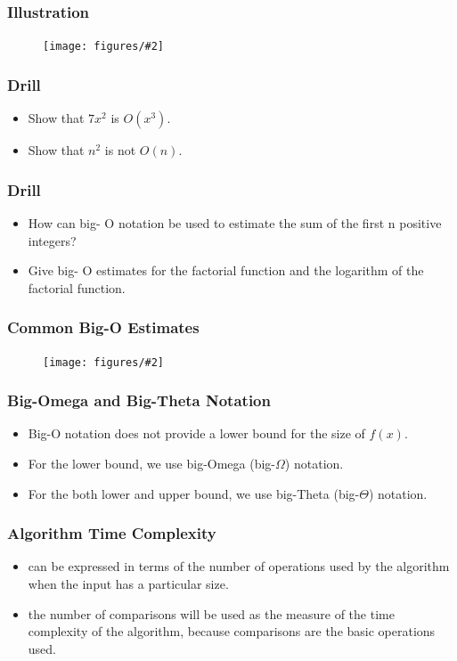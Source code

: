 \documentclass{beamer}
\newcommand{\fig}[2]{
\begin{center}
\begin{figure}
\texttt{[image: figures/\#2]}
\end{figure}
\end{center}
}
\begin{document}
 \begin{frame}
\frametitle{Illustration}
\fig{0.5}{bigo}
\end{frame}

\begin{frame}
\frametitle{\huge Drill}
\Large
\begin{itemize} 
\item <1->  Show that $7x^2$ is $O(x^3)$.
\item <2->  Show that $n^2$ is not $O (n)$.
\end{itemize}
 \end{frame}



\begin{frame}
\frametitle{\huge Drill}
\Large
\begin{itemize} 
\item <1->  How can big- O notation be used to estimate the sum of the first n positive integers?
\item <2->  Give big- O estimates for the factorial function and the logarithm of the factorial function.
\end{itemize}
 \end{frame}


 \begin{frame}
\frametitle{\huge Common Big-O Estimates}
\fig{0.5}{bigo2}
\end{frame}


\begin{frame}
\frametitle{\huge Big-Omega and Big-Theta Notation}
\Large
\begin{itemize} 
\item <1->  Big-O notation does not provide a lower bound for the size of $f(x)$.
\item <2->  For the lower bound, we use big-Omega (big-$\Omega$) notation.
\item <3->  For the both lower and upper bound, we use big-Theta (big-$\Theta$) notation.
\end{itemize}
 \end{frame}


\begin{frame}
\frametitle{\huge Algorithm Time Complexity}
\Large
\begin{itemize} 
\item <1->  can be expressed in terms of the number of operations used by the algorithm when the input has a particular size.
\item <2->  the number of comparisons will be used as the measure of the time complexity of the algorithm, because comparisons are the basic operations used.
\end{itemize}
 \end{frame}
\end{document}
